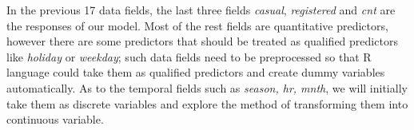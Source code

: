 In the previous 17 data fields, the last three fields \emph{casual}, \emph{registered} and \emph{cnt} are the responses of our model. Most of the rest fields are quantitative predictors, however there are some predictors that should be treated as qualified predictors like \emph{holiday} or \emph{weekday}; such data fields need to be preprocessed so that R language could take them as qualified predictors and create dummy variables automatically. As to the temporal fields such as \emph{season, hr, mnth}, we will initially take them as discrete variables and explore the method of transforming them into continuous variable. 